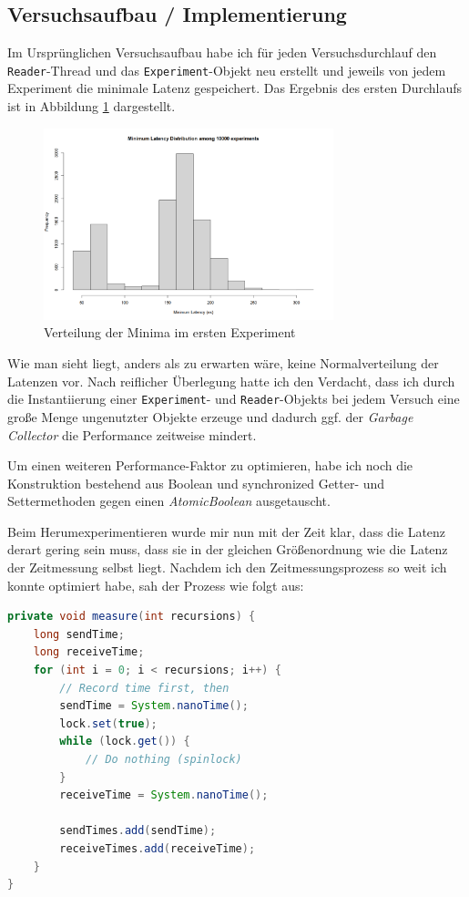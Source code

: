 \documentclass[12pt]{article}
\begin{document}
\subsection{Versuchsaufbau / Implementierung}
Im Ursprünglichen Versuchsaufbau habe ich für jeden Versuchsdurchlauf den \texttt{Reader}-Thread und das \texttt{Experiment}-Objekt neu erstellt und jeweils von jedem Experiment die minimale Latenz gespeichert.
Das Ergebnis des ersten Durchlaufs ist in Abbildung \ref{img:spinlock_first} dargestellt.

\begin{figure}[H]
	\centering
	\includegraphics[width=0.75\textwidth]{./img/spinlock_first_try}
	\caption{Verteilung der Minima im ersten Experiment}
	\label{img:spinlock_first}
\end{figure}

Wie man sieht liegt, anders als zu erwarten wäre, keine Normalverteilung der Latenzen vor.
Nach reiflicher Überlegung hatte ich den Verdacht, dass ich durch die Instantiierung einer \texttt{Experiment}- und \texttt{Reader}-Objekts bei jedem Versuch eine große Menge ungenutzter Objekte erzeuge und dadurch ggf. der \emph{Garbage Collector} die Performance zeitweise mindert.

Um einen weiteren Performance-Faktor zu optimieren, habe ich noch die Konstruktion bestehend aus Boolean und synchronized Getter- und Settermethoden gegen einen \emph{AtomicBoolean} ausgetauscht.

Beim Herumexperimentieren wurde mir nun mit der Zeit klar, dass die Latenz derart gering sein muss, dass sie in der gleichen Größenordnung wie die Latenz der Zeitmessung selbst liegt.
Nachdem ich den Zeitmessungsprozess so weit ich konnte optimiert habe, sah der Prozess wie folgt aus:
\begin{lstlisting}[language=java,caption={Spinlocks: Latenzmessung im Main Thread (optimiert)}]
private void measure(int recursions) {
	long sendTime;
	long receiveTime;
	for (int i = 0; i < recursions; i++) {
		// Record time first, then
		sendTime = System.nanoTime();
		lock.set(true);
		while (lock.get()) {
			// Do nothing (spinlock)
		}
		receiveTime = System.nanoTime();
		
		sendTimes.add(sendTime);
		receiveTimes.add(receiveTime);
	}
}
\end{lstlisting}
\end{document}
